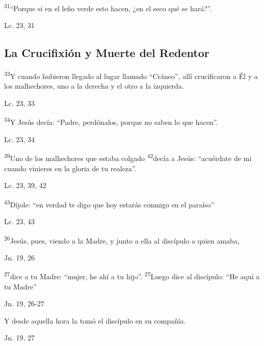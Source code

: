 \documentclass[a4paper,11pt]{article}
\begin{document}
      \textsuperscript{31}``Porque si en el leño verde esto hacen, ¿en el seco qué se hará?''.
      \begin{center}
        Lc. 23, 31
      \end{center}

    \subsection*{\hfil La Crucifixión y Muerte del Redentor \hfil}
      
      \textsuperscript{33}Y cuando hubieron llegado al lugar llamado ``Cráneo'', allí crucificaron a Él y a los malhechores, uno a la derecha y el otro a la izquierda.
      \begin{center}
        Lc. 23, 33
      \end{center}

      \textsuperscript{34}Y Jesús decía: ``Padre, perdónalos, porque no saben lo que hacen''.
      \begin{center}
        Lc. 23, 34
      \end{center}

      \textsuperscript{39}Uno de los malhechores que estaba colgado \textsuperscript{42}decía a Jesús: ``acuérdate de mi cuando vinieres en la gloria de tu realeza''.
      \begin{center}
        Lc. 23, 39, 42
      \end{center}

      \textsuperscript{43}Díjole: ``en verdad te digo que hoy estarás conmigo en el paraíso''
      \begin{center}
        Lc. 23, 43
      \end{center}

      \textsuperscript{26}Jesús, pues, viendo a la Madre, y junto a ella al discípulo a quien amaba,
      \begin{center}
        Jn. 19, 26
      \end{center}

      \textsuperscript{27}dice a tu Madre: ``mujer, he ahí a tu hijo''. \textsuperscript{27}Luego dice al discípulo: ``He aquí a tu Madre''
      \begin{center}
        Jn. 19, 26-27
      \end{center}

      Y desde aquella hora la tomó el discípulo en su compañía.
      \begin{center}
        Jn. 19, 27
      \end{center}
\end{document}
